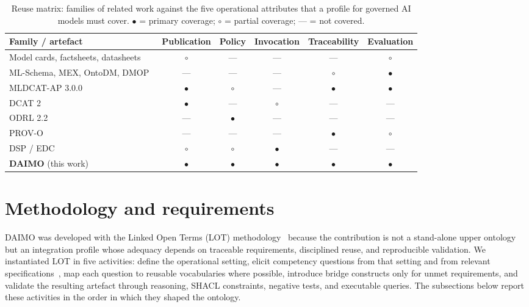 \documentclass[11pt,a4paper]{article}
\begin{document}
\begin{table}[t]
\small\sf\centering
\caption{Reuse matrix: families of related work against the five operational attributes that a profile for governed AI models must cover. $\bullet$ = primary coverage; $\circ$ = partial coverage; --- = not covered.\label{tab:reuse-matrix}}
\begin{tabular}{@{}lccccc@{}}
\toprule
\textbf{Family / artefact} & \textbf{Publication} & \textbf{Policy} & \textbf{Invocation} & \textbf{Traceability} & \textbf{Evaluation} \\
\midrule
Model cards, factsheets, datasheets~\cite{mitchell19,arnold19,gebru21} & $\circ$ & --- & --- & --- & $\circ$ \\
ML-Schema, MEX, OntoDM, DMOP~\cite{mls,mex,ontodm,dmop} & --- & --- & --- & $\circ$ & $\bullet$ \\
MLDCAT-AP 3.0.0~\cite{mldcatap} & $\bullet$ & $\circ$ & --- & $\bullet$ & $\bullet$ \\
DCAT 2~\cite{dcat2} & $\bullet$ & --- & $\circ$ & --- & --- \\
ODRL 2.2~\cite{odrl22} & --- & $\bullet$ & --- & --- & --- \\
PROV-O~\cite{provo} & --- & --- & --- & $\bullet$ & $\circ$ \\
DSP / EDC~\cite{dsp,edc} & $\circ$ & $\circ$ & $\bullet$ & --- & --- \\
\midrule
\textbf{DAIMO} (this work) & $\bullet$ & $\bullet$ & $\bullet$ & $\bullet$ & $\bullet$ \\
\bottomrule
\end{tabular}
\end{table}

\section{Methodology and requirements}\label{sec:method}

DAIMO was developed with the Linked Open Terms (LOT) methodology~\cite{lot22} because the contribution is not a stand-alone upper ontology but an integration profile whose adequacy depends on traceable requirements, disciplined reuse, and reproducible validation. We instantiated LOT in five activities: define the operational setting, elicit competency questions from that setting and from relevant specifications~\cite{gruninger95}, map each question to reusable vocabularies where possible, introduce bridge constructs only for unmet requirements, and validate the resulting artefact through reasoning, SHACL constraints, negative tests, and executable queries. The subsections below report these activities in the order in which they shaped the ontology.
\end{document}
